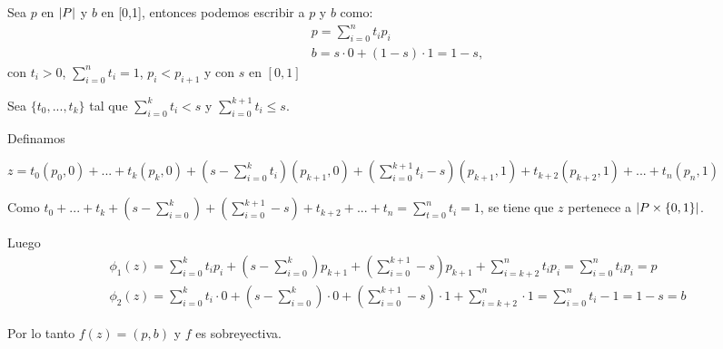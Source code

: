 \begin{Dem}
Sea $p$ en $\left| P \right|$ y $b$ en [0,1], entonces podemos escribir a $p$ y $b$ como:
\begin{eqnarray}
p = \sum_{i=0}^{n}t_ip_i \\
b = s\cdot 0 + (1-s)\cdot 1 = 1-s, 
\end{eqnarray}
con $t_i>0$, $\sum_{i=0}^{n}t_i =1$, $p_i<p_{i+1}$ y con $s$ en $[0,1]$

Sea $\{t_0,...,t_k\} $ tal que $\sum_{i=0}^{k}t_i <s$ y $\sum_{i=0}^{k+1}t_i\leq s$.

Definamos

$z =t_0(p_0,0)+ ...+ t_k(p_k,0)+(s-\sum_{i=0}^{k}t_i)(p_{k+1},0)+(\sum_{i=0}^{k+1}t_i-s)(p_{k+1},1)+t_{k+2}(p_{k+2},1)+...+t_n(p_n,1)$ 

Como $t_0 +...+t_k+(s-\sum_{i=0}^{k})+(\sum_{i=0}^{k+1}-s)+t_{k+2}+...+t_n = \sum_{t=0}^{n}t_i = 1$, se tiene que $z$ pertenece a $\left| P\times\{0,1\} \right|$.

Luego
\begin{eqnarray*}
\phi_1(z) = \sum_{i=0}^{k}t_ip_i + (s-\sum_{i=0}^{k})p_{k+1} +(\sum_{i=0}^{k+1}-s)p_{k+1} + \sum_{i = k+2}^{n}t_ip_i = \sum_{i=0}^{n}t_ip_i = p\\
\phi_2(z) = \sum_{i=0}^{k}t_i\cdot 0 + (s-\sum_{i=0}^{k})\cdot 0 +(\sum_{i=0}^{k+1}-s)\cdot 1 + \sum_{i = k+2}^{n}\cdot 1 = \sum_{i=0}^{n}t_i -1 = 1-s = b
\end{eqnarray*}

Por lo tanto $f(z)=(p,b)$ y $f$ es sobreyectiva.
\end{Dem}


